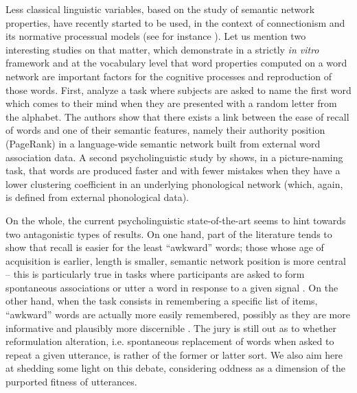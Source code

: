 Less classical linguistic variables, based on the study of semantic network properties, have recently started to be used, in the context of connectionism and its normative processual models (see for instance \citet{collins1975spreading}).
Let us mention two interesting studies on that matter, which demonstrate in a strictly \emph{in vitro} framework and at the vocabulary level that word properties computed on a word network are important factors for the cognitive processes and reproduction of those words.
First, \citet{Griffiths07} analyze a task where subjects are asked to name the first word which comes to their mind when they are presented with a random letter from the %
alphabet. The authors show that there exists a link between the ease of recall of words and one of their semantic features, namely their authority position (PageRank) in a language-wide semantic network built from external word association data.
A second psycholinguistic study by \citet{Chan10} shows, in a picture-naming task, that words are produced faster and with fewer mistakes when they have a lower clustering coefficient in an underlying phonological network (which, again, is  defined from external phonological data).

On the whole, the current psycholinguistic state-of-the-art seems to hint towards two antagonistic types of results.
On one hand, part of the literature tends to show that recall is easier for the least ``awkward'' words; those whose age of acquisition is earlier, length is smaller, semantic network position is more central -- this is particularly true in tasks where participants are asked to form spontaneous associations or utter a word in response to a given signal \CN.
On the other hand, when the task consists in remembering a specific list of items, ``awkward'' words are actually more easily remembered, possibly as they are more informative and plausibly more discernible \CN.
The jury is still out as to whether reformulation alteration, i.e. spontaneous replacement of words when asked to repeat a given utterance, is rather of the former or latter sort.
We also aim here at shedding some light on this debate, considering oddness as a dimension of the purported fitness of utterances.
